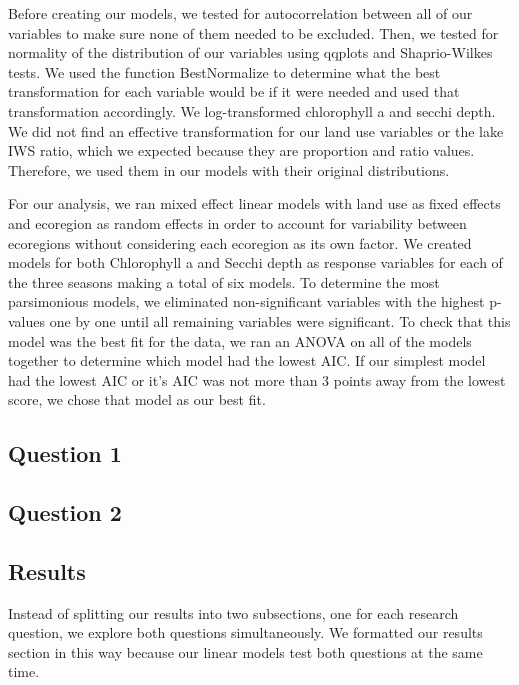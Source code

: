 \documentclass[12pt,]{article}
\begin{document}
Before creating our models, we tested for autocorrelation between all of
our variables to make sure none of them needed to be excluded. Then, we
tested for normality of the distribution of our variables using qqplots
and Shaprio-Wilkes tests. We used the function BestNormalize to
determine what the best transformation for each variable would be if it
were needed and used that transformation accordingly. We log-transformed
chlorophyll a and secchi depth. We did not find an effective
transformation for our land use variables or the lake IWS ratio, which
we expected because they are proportion and ratio values. Therefore, we
used them in our models with their original distributions.

For our analysis, we ran mixed effect linear models with land use as
fixed effects and ecoregion as random effects in order to account for
variability between ecoregions without considering each ecoregion as its
own factor. We created models for both Chlorophyll a and Secchi depth as
response variables for each of the three seasons making a total of six
models. To determine the most parsimonious models, we eliminated
non-significant variables with the highest p-values one by one until all
remaining variables were significant. To check that this model was the
best fit for the data, we ran an ANOVA on all of the models together to
determine which model had the lowest AIC. If our simplest model had the
lowest AIC or it's AIC was not more than 3 points away from the lowest
score, we chose that model as our best fit.

\hypertarget{question-1}{%
\subsection{Question 1 }\label{question-1}}

\hypertarget{question-2}{%
\subsection{Question 2}\label{question-2}}

\hypertarget{results}{%
\subsection{Results}\label{results}}

Instead of splitting our results into two subsections, one for each
research question, we explore both questions simultaneously. We
formatted our results section in this way because our linear models test
both questions at the same time.
\end{document}
